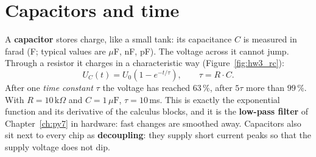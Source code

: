 \section*{Capacitors and time}
A \textbf{capacitor} stores charge, like a small tank: its capacitance $C$ is measured in farad (F; typical values are $\mu$F, nF, pF). The voltage across it cannot jump. Through a resistor it charges in a characteristic way (Figure~\ref{fig:hw3_rc}):
\[
U_C(t)=U_0\left(1-e^{-t/\tau}\right),\qquad \tau=R\cdot C.
\]
After one \emph{time constant} $\tau$ the voltage has reached $63\,\%$, after $5\tau$ more than $99\,\%$. With $R=10\,\text{k}\Omega$ and $C=1\,\mu\text{F}$, $\tau=10$\,ms. This is exactly the exponential function and its derivative of the calculus blocks, and it is the \textbf{low-pass filter} of Chapter~\ref{ch:py7} in hardware: fast changes are smoothed away. Capacitors also sit next to every chip as \textbf{decoupling}: they supply short current peaks so that the supply voltage does not dip.
\begin{center}
\label{fig:hw3_rc}
\end{center}

